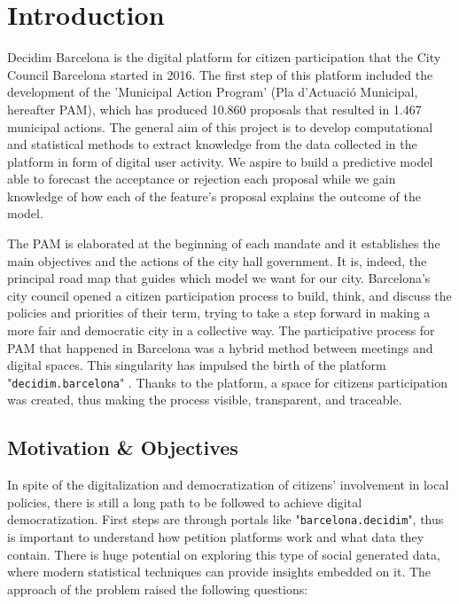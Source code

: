 \normallinespacing

\chapter{Introduction}
Decidim Barcelona is the digital platform for citizen participation that the City Council Barcelona started in 2016. The first step of this platform included the development of the 'Municipal Action Program' (Pla d'Actuaci\'o Municipal, hereafter PAM), which has produced 10.860 proposals that resulted in 1.467 municipal actions. The general aim of this project is to develop computational and statistical methods to extract knowledge from the data collected in the platform in form of digital user activity. We aspire to build a predictive model able to forecast the acceptance or rejection each proposal while we gain knowledge of how each of the feature's proposal explains the outcome of the model.

The PAM is elaborated at the beginning of each mandate and it establishes the main objectives and the actions of the city hall government. It is, indeed, the principal road map that guides which model we want for our city. Barcelona's city council opened a citizen participation process to build, think, and discuss the policies and priorities of their term, trying to take a step forward in making a more fair and democratic city in a collective way. The participative process for PAM that happened in Barcelona was a hybrid method between meetings and digital spaces. This singularity has impulsed the birth of the platform "\texttt{decidim.barcelona}" \cite{pam}. Thanks to the platform, a space for citizens participation was created, thus making the process visible, transparent, and traceable. 

\section{Motivation \& Objectives}

In spite of the digitalization and democratization of citizens' involvement in local policies, there is still a long path to be followed to achieve digital democratization. First steps are through portals like "\verb+barcelona.decidim+", thus is important to understand how petition platforms work and what data they contain. There is huge potential on exploring this type of social generated data, where modern statistical techniques can provide insights embedded on it. The approach of the problem raised the following questions:


